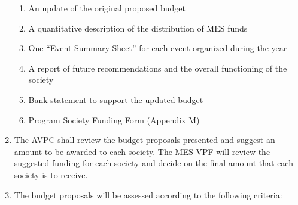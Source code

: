 \begin{enumerate}
  \begin{enumerate}
   \item
    An update of the original proposed budget
   \item
    A quantitative description of the distribution of MES funds
   \item
    One ``Event Summary Sheet'' for each event organized during the year
   \item
    A report of future recommendations and the overall functioning of
    the society
   \item
    Bank statement to support the updated budget
   \item
    Program Society Funding Form (Appendix M)
  \end{enumerate}
 \item
  The AVPC shall review the budget proposals presented and suggest an
  amount to be awarded to each society. The MES VPF will review the
  suggested funding for each society and decide on the final amount that
  each society is to receive.
 \item
  The budget proposals will be assessed according to the following
  criteria:


\end{enumerate}
